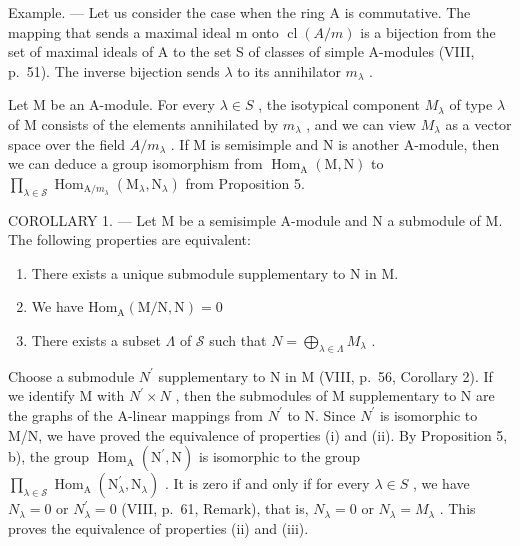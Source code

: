 Example. --- Let us consider the case when the ring A is commutative. The mapping that sends a maximal ideal m onto \(\operatorname{cl}(A/m)\) is a bijection from the set of maximal ideals of A to the set S of classes of simple A-modules (VIII, p.~51). The inverse bijection sends \(\lambda\) to its annihilator \(m_{\lambda}\) .

Let M be an A-module. For every \(\lambda\in S\) , the isotypical component \(M_{\lambda}\) of type \(\lambda\) of M consists of the elements annihilated by \(m_{\lambda}\) , and we can view \(M_{\lambda}\) as a vector space over the field \(A/m_{\lambda}\) . If M is semisimple and N is another A-module, then we can deduce a group isomorphism from \(\operatorname{Hom}_{\mathrm{A}}(\mathrm{M},\mathrm{N})\) to \(\prod_{\lambda\in\mathcal{S}}\operatorname{Hom}_{\mathrm{A}/m_{\lambda}}(\mathrm{M}_{\lambda},\mathrm{N}_{\lambda})\) from Proposition 5.

COROLLARY 1. --- Let M be a semisimple A-module and N a submodule of M. The following properties are equivalent:

\begin{enumerate}
\def\labelenumi{(\roman{enumi})}
\item
  There exists a unique submodule supplementary to N in M.
\item
  We have \(\mathrm{Hom}_{\mathrm{A}}(\mathrm{M} / \mathrm{N},\mathrm{N}) = 0\)
\item
  There exists a subset \(\Lambda\) of \(\mathcal{S}\) such that \(N = \bigoplus_{\lambda \in \Lambda} M_{\lambda}\) .
\end{enumerate}

Choose a submodule \(N^{\prime}\) supplementary to N in M (VIII, p.~56, Corollary 2). If we identify M with \(N^{\prime} \times N\) , then the submodules of M supplementary to N are the graphs of the A-linear mappings from \(N^{\prime}\) to N. Since \(N^{\prime}\) is isomorphic to M/N, we have proved the equivalence of properties (i) and (ii). By Proposition 5, b), the group \(\operatorname{Hom}_{\mathrm{A}}(\mathrm{N}^{\prime}, \mathrm{N})\) is isomorphic to the group \(\prod_{\lambda \in \mathcal{S}} \operatorname{Hom}_{\mathrm{A}}(\mathrm{N}_{\lambda}^{\prime}, \mathrm{N}_{\lambda})\) . It is zero if and only if for every \(\lambda \in S\) , we have \(N_{\lambda} = 0\) or \(N_{\lambda}^{\prime} = 0\) (VIII, p.~61, Remark), that is, \(N_{\lambda} = 0\) or \(N_{\lambda} = M_{\lambda}\) . This proves the equivalence of properties (ii) and (iii).

